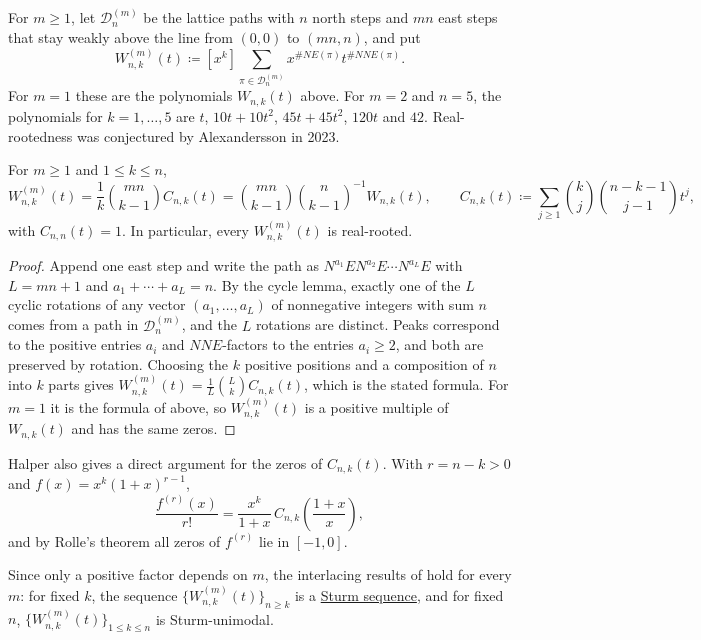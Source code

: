 \begin{example*}
\label{fussCatalanNNERealRooted}
For $m\geq1$, let $\mathcal{D}^{(m)}_n$ be the lattice paths with $n$ north
steps and $mn$ east steps that stay weakly above the line from $(0,0)$ to
$(mn,n)$, and put
\[
  W^{(m)}_{n,k}(t)\coloneqq [x^k]\sum_{\pi\in\mathcal{D}^{(m)}_n}
  x^{\#NE(\pi)}t^{\#NNE(\pi)}.
\]
For $m=1$ these are the polynomials $W_{n,k}(t)$ above.  For $m=2$ and $n=5$,
the polynomials for $k=1,\dotsc,5$ are $t$, $10t+10t^2$, $45t+45t^2$, $120t$
and $42$.  Real-rootedness was conjectured by Alexandersson in 2023.

\begin{theorem}
For $m\geq1$ and $1\leq k\leq n$,
\[
  W^{(m)}_{n,k}(t)=\frac{1}{k}\binom{mn}{k-1}C_{n,k}(t)
  =\binom{mn}{k-1}\binom{n}{k-1}^{-1}W_{n,k}(t),
  \qquad
  C_{n,k}(t)\coloneqq\sum_{j\geq1}\binom{k}{j}\binom{n-k-1}{j-1}t^j,
\]
with $C_{n,n}(t)=1$.  In particular, every $W^{(m)}_{n,k}(t)$ is real-rooted.
\end{theorem}

\begin{proof}
Append one east step and write the path as
$N^{a_1}EN^{a_2}E\dotsm N^{a_L}E$ with $L=mn+1$ and $a_1+\dotsb+a_L=n$.
By the cycle lemma, exactly one of the $L$ cyclic rotations of any vector
$(a_1,\dotsc,a_L)$ of nonnegative integers with sum $n$ comes from a path in
$\mathcal{D}^{(m)}_n$, and the $L$ rotations are distinct.  Peaks correspond to
the positive entries $a_i$ and $NNE$-factors to the entries $a_i\geq2$, and both
are preserved by rotation.  Choosing the $k$ positive positions and a
composition of $n$ into $k$ parts gives
$W^{(m)}_{n,k}(t)=\frac{1}{L}\binom{L}{k}C_{n,k}(t)$, which is the stated
formula.  For $m=1$ it is the formula of
\cite{BonaDimitrovLabelleLiPappeVindasMelendezZhuang2025} above, so
$W^{(m)}_{n,k}(t)$ is a positive multiple of $W_{n,k}(t)$ and has the same
zeros.
\end{proof}

Halper also gives a direct argument for the zeros of $C_{n,k}(t)$.  With
$r=n-k>0$ and $f(x)=x^k(1+x)^{r-1}$,
\[
  \frac{f^{(r)}(x)}{r!}=\frac{x^k}{1+x}\,C_{n,k}\!\left(\frac{1+x}{x}\right),
\]
and by Rolle's theorem all zeros of $f^{(r)}$ lie in $[-1,0]$.

Since only a positive factor depends on $m$, the interlacing results of
\cite{WangZhang2024} hold for every $m$: for fixed $k$, the sequence
$\{W^{(m)}_{n,k}(t)\}_{n\geq k}$ is a \hyperref[sturmSequence]{Sturm sequence},
and for fixed $n$, $\{W^{(m)}_{n,k}(t)\}_{1\leq k\leq n}$ is Sturm-unimodal.
\end{example*}


